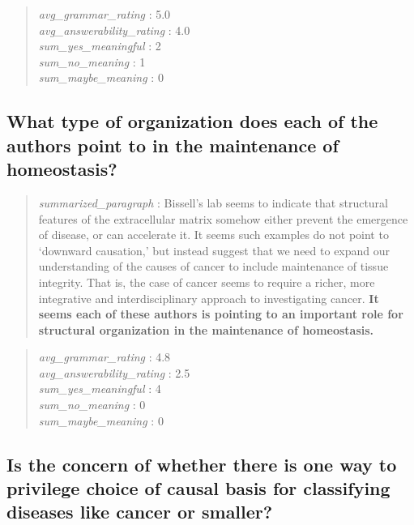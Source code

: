 \begin{quote}
\emph{avg\_grammar\_rating} : 5.0\\
\emph{avg\_answerability\_rating} : 4.0\\
\emph{sum\_yes\_meaningful} : 2\\
\emph{sum\_no\_meaning} : 1\\
\emph{sum\_maybe\_meaning} : 0
\end{quote}

\hypertarget{what-type-of-organization-does-each-of-the-authors-point-to-in-the-maintenance-of-homeostasis}{%
\subsection{What type of organization does each of the authors point to
in the maintenance of
homeostasis?}\label{what-type-of-organization-does-each-of-the-authors-point-to-in-the-maintenance-of-homeostasis}}

\begin{quote}
\emph{summarized\_paragraph} : Bissell's lab seems to indicate that
structural features of the extracellular matrix somehow either prevent
the emergence of disease, or can accelerate it. It seems such examples
do not point to `downward causation,' but instead suggest that we need
to expand our understanding of the causes of cancer to include
maintenance of tissue integrity. That is, the case of cancer seems to
require a richer, more integrative and interdisciplinary approach to
investigating cancer. \textbf{It seems each of these authors is pointing
to an important role for structural organization in the maintenance of
homeostasis.}
\end{quote}

\begin{quote}
\emph{avg\_grammar\_rating} : 4.8\\
\emph{avg\_answerability\_rating} : 2.5\\
\emph{sum\_yes\_meaningful} : 4\\
\emph{sum\_no\_meaning} : 0\\
\emph{sum\_maybe\_meaning} : 0
\end{quote}

\hypertarget{is-the-concern-of-whether-there-is-one-way-to-privilege-choice-of-causal-basis-for-classifying-diseases-like-cancer-or-smaller}{%
\subsection{Is the concern of whether there is one way to privilege
choice of causal basis for classifying diseases like cancer or
smaller?}\label{is-the-concern-of-whether-there-is-one-way-to-privilege-choice-of-causal-basis-for-classifying-diseases-like-cancer-or-smaller}}

